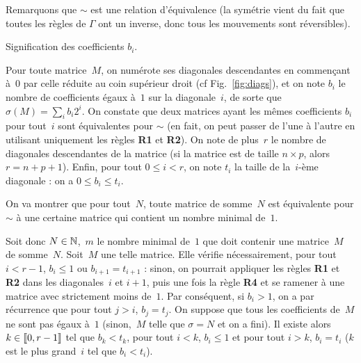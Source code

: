 Remarquons que $\sim$ est une relation d'équivalence (la symétrie vient du fait que toutes les règles de $\Gamma$ ont un inverse, donc tous les mouvements sont réversibles).



\begin{floatingfigure}[r]{.5\textwidth}
\centering


\caption{Signification des coefficients $b_i$.}
\label{fig:diags}
\end{floatingfigure}
Pour toute matrice~$M$, on numérote ses diagonales descendantes en commençant
à~$0$ par celle réduite au coin supérieur droit (cf Fig.~\ref{fig:diags}), et on
note $b_i$ le nombre de coefficients égaux à~$1$ sur la diagonale~$i$, de sorte
que \linebreak \mbox{$\sigma (M) = \sum\limits_ib_i2^i$}. On constate que deux
matrices ayant les mêmes coefficients $b_i$ pour \linebreak tout~$i$ sont équivalentes pour $\sim$ (en fait, on peut passer de l'une à l'autre en utilisant uniquement les règles \textbf{R1} et \textbf{R2}). On note de plus~$r$ le nombre de diagonales descendantes de la matrice (si la matrice est de taille $n\times p$, alors $r = n+p+1$). Enfin, pour tout $0\leq i < r$, on note $t_i$ la taille de la~$i$-ème diagonale : on a $0\leq b_i \leq t_i$. 
 
On va montrer que pour tout~$N$, toute matrice de somme~$N$ est équivalente pour $\sim$ à une certaine matrice qui contient un nombre minimal de~$1$.

Soit donc $N \in \mathbb{N}$,~$m$ le nombre minimal de~$1$ que doit contenir une matrice~$M$ de somme~$N$. Soit~$M$ une telle matrice. Elle vérifie néces\-saire\-ment, pour tout $i<r-1$, $b_i \leq 1$ ou $b_{i+1}=t_{i+1}$ : sinon, on pourrait appliquer les règles \textbf{R1} et \textbf{R2} dans les diagonales~$i$ et $i+1$, puis une fois la règle \textbf{R4} et se ramener à une matrice avec strictement moins de~$1$.
Par conséquent, si $b_i > 1$, on a par récurrence que pour tout $j>i$, $b_j = t_j$.
On suppose que tous les coefficients de~$M$ ne sont pas égaux à~$1$ (sinon,~$M$ telle que $\sigma = N$ et on a fini).
Il existe alors $k \in [\kern-0.15em [ 0, r-1 ]\kern-0.15em]$ tel que $b_k<t_k$, pour tout  $i<k$, $b_i \leq 1$ et pour tout $i>k$, $b_i=t_i$ ($k$ est le plus grand~$i$ tel que $b_i < t_i$).


